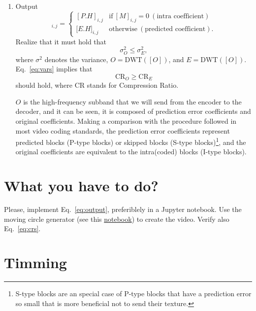 \begin{enumerate}
\item Output
  \begin{equation}
    [O]_{i,j} = \left\{
      \begin{array}{ll}
        [P.H]_{i,j} & \text{if}~[M]_{i,j} = 0~(\text{intra~coefficient})\\
        {[}E.H{]}_{i,j} & \text{otherwise}~(\text{predicted~coefficient}).
      \end{array}
    \right.
    \label{eq:output}
  \end{equation}
  Realize that it must hold that
  \begin{equation}
    \sigma^2_O \le \sigma^2_E,
    \label{eq:vars}
  \end{equation}
  where $\sigma^2$ denotes the variance, $O=\text{DWT}([O])$, and
  $E=\text{DWT}([O])$. Eq.~\ref{eq:vars} implies that
  \begin{equation}
    \text{CR}_O \ge \text{CR}_E
    \label{eq:crs}
  \end{equation}
  should hold, where CR stands for Compression Ratio.

  $O$ is the high-frequency subband that we will send from the
  encoder to the decoder, and it can be seen, it is composed of
  prediction error coefficients and original coefficients. Making a
  comparison with the procedure followed in most video coding
  standards, the prediction error coefficients represent predicted
  blocks (P-type blocks) or skipped blocks (S-type
  blocks)\footnote{S-type blocks are an special case of P-type blocks
  that have a prediction error so small that is more beneficial not to
  send their texture.}, and the original coefficients are equivalent
  to the intra(coded) blocks (I-type blocks).
\end{enumerate}

\section{What you have to do?}

Please, implement Eq.~\ref{eq:output}, preferiblely in a Jupyter
notebook. Use the moving circle generator (see
this \href{https://github.com/Sistemas-Multimedia/Sistemas-Multimedia.github.io/blob/master/study_guide/11-MC_in_DWT_domain/DWT_shift_invariance.ipynb}{notebook})
to create the video. Verify also Eq.~\ref{eq:crs}.

\section{Timming}

